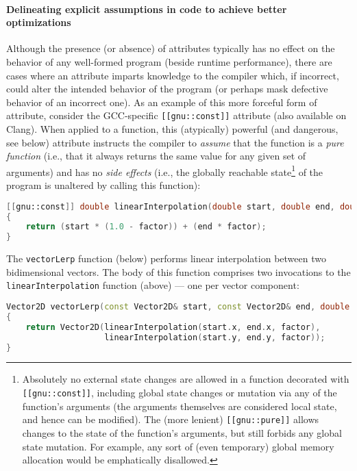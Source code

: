\documentclass[twoside,10pt,letterpaper,usenames]{newstyle-PearsonGeneric-7-38}
\begin{document}
\paragraph[Delineating explicit assumptions in code to achieve better optimizations]{Delineating explicit assumptions in code to achieve better optimizations}\label{delineating-explicit-assumptions-in-code-to-achieve-better-optimizations}

Although the presence (or absence) of attributes typically has no effect
on the behavior of any well-formed program (beside runtime performance),
there are cases where an attribute imparts knowledge to the compiler
which, if incorrect, could alter the intended behavior of the program
(or perhaps mask defective behavior of an incorrect one). As an example
of this more forceful form of attribute, consider the GCC-specific
\texttt{[[gnu::const]]} attribute (also available on Clang). When
applied to a function, this (atypically) powerful (and dangerous, see
below) attribute instructs the compiler to \emph{assume} that the
function is a \emph{pure function} (i.e., that it always returns the
same value for any given set of arguments) and has no \emph{side
effects} (i.e., the globally reachable state{\cprotect\footnote{Absolutely
no external state changes are allowed in a function decorated with
\texttt{[[gnu::const]]}, including global state changes or mutation
via any of the function's arguments (the arguments themselves are
considered local state, and hence can be modified). The (more lenient)
\texttt{[[gnu::pure]]} allows changes to the state of the function's
arguments, but still forbids any global state mutation. For example,
any sort of (even temporary) global memory allocation would be
emphatically disallowed.}} of the program is unaltered by calling this
function):

\begin{lstlisting}[language=C++]
[[gnu::const]] double linearInterpolation(double start, double end, double factor)
{
    return (start * (1.0 - factor)) + (end * factor);
}
\end{lstlisting}
    

The \texttt{vectorLerp} function (below) performs linear interpolation
between two bidimensional vectors. The body of this function comprises
two invocations to the \texttt{linearInterpolation} function (above) ---
one per vector component:

\begin{lstlisting}[language=C++]
Vector2D vectorLerp(const Vector2D& start, const Vector2D& end, double factor)
{
    return Vector2D(linearInterpolation(start.x, end.x, factor),
                    linearInterpolation(start.y, end.y, factor));
}
\end{lstlisting}
    
\end{document}
